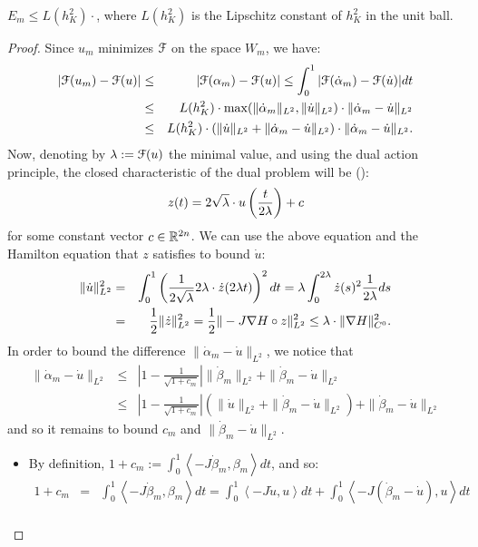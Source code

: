 \documentclass[../capacities_main.tex]{subfiles}
\begin{document}
\begin{Lemma}
	$E_m\leq L(h_K^2) \cdot $, where $L(h_K^2)$ is the Lipschitz constant of $h_K^2$ in the unit ball.
\end{Lemma}
\begin{proof}
	Since $u_m$ minimizes ${\mathcal F}$ on the space $W_m$, we have:
	\begin{eqnarray*}
		|{\mathcal F}(u_m)-{\mathcal F}(u)|&\leq& |{\mathcal F}(\alpha_m)-{\mathcal F}(u)| \leq \int_0^1 |{\mathcal F}(\dot \alpha_m)-{\mathcal F}(\dot u)| dt\\
		&\leq& L(h_K^2) \cdot \max(\|\dot \alpha_m\|_{L^2},\|\dot u\|_{L^2})\cdot \|\dot \alpha_m - \dot u\|_{L^2}\\
		&\leq& L(h_K^2) \cdot (\|\dot u\|_{L^2}+\|\dot \alpha_m - \dot u\|_{L^2}) \cdot \|\dot \alpha_m - \dot u\|_{L^2}.
	\end{eqnarray*}
	Now, denoting by $\lambda:={\mathcal F}(u)$ the minimal value, and using the dual action principle, the closed characteristic of the dual problem will be (\cite{going1998diss}):
	\[
	z(t)= 2\sqrt{\lambda} \cdot u\left(\frac{t}{2\lambda}\right) + c
	\]
	for some constant vector $c\in{\mathbb R}^{2n}$. We can use the above equation and the Hamilton equation that $z$ satisfies to bound $\dot u$:
	\begin{eqnarray*}
		\|\dot u\|_{L^2}^2 &=& \int_0^1 \left(\frac{1}{2\sqrt{\lambda}}2\lambda\cdot\dot z(2\lambda t)\right)^2 dt =\lambda\int_0^{2\lambda} \dot z(s)^2 \frac{1}{2\lambda}ds \\
		&=& \frac{1}{2}\|\dot z\|_{L^2}^2 = \frac{1}{2}\|-J\nabla H\circ z\|_{L^2}^2 \leq \lambda\cdot \|\nabla H\|_{C^0}^2. 
	\end{eqnarray*}
	In order to bound the difference $\|\dot\alpha_m-\dot u\|_{L^2}$,  we notice that 
	\begin{eqnarray*}
		\|\dot\alpha_m-\dot u\|_{L^2}&\leq& \left|1-\frac{1}{\sqrt{1+c_m}}\right|\|\dot\beta_m\|_{L^2}+\|\dot\beta_m- \dot u\|_{L^2}\\
		&\leq& \left|1-\frac{1}{\sqrt{1+c_m}}\right|\left(\|\dot u\|_{L^2}+\|\dot\beta_m-\dot u\|_{L^2}\right)+\|\dot\beta_m-\dot u\|_{L^2}
	\end{eqnarray*}
	and so it remains to bound $c_m$ and $\|\dot\beta_m-\dot u\|_{L^2}$.
	\begin{itemize}
		\item By definition, $1+c_m:=\int_0^1 \left<-J\dot\beta_m,\beta_m\right>dt$, and so:
		\begin{eqnarray*}
			1+c_m &=& \int_0^1 \left<-J\dot\beta_m,\beta_m\right>dt = \int_0^1 \left<-J\dot u,u\right>dt + \int_0^1 \left<-J(\dot\beta_m-\dot u),u\right>dt\\

\end{eqnarray*}
\end{itemize}
\end{proof}
\end{document}
